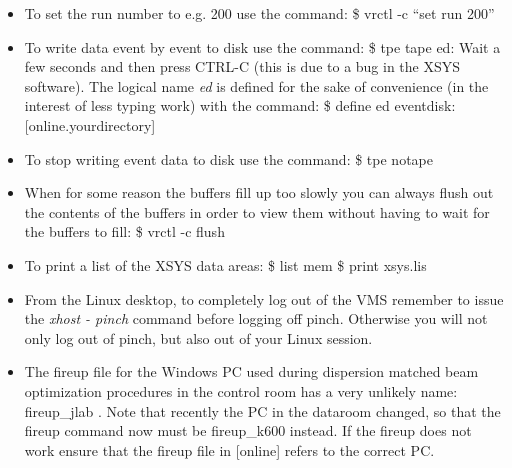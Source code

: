 \documentclass[11pt]{report}
\begin{document}
\begin{itemize}
\item To set the run number to e.g. 200 use the command: \newline \$ vrctl -c ``set run 200''
\item To write data event by event to disk use the command: \newline \$ tpe tape ed: \newline Wait a few seconds and then press CTRL-C (this is due to a bug in the XSYS software). The logical 
name {\it ed} is defined for the sake of convenience (in the interest of less typing work) with the command: \newline \$ define ed eventdisk:[online.yourdirectory]
\item To stop writing event data to disk use the command: \newline \$ tpe notape
\item When for some reason the buffers fill up too slowly you can always flush out the contents of the buffers in order to view them without having to wait for the buffers to fill: \newline \$ vrctl -c flush
\item To print a list of the XSYS data areas: \newline \$ list mem \newline \$ print xsys.lis
\item From the Linux desktop, to completely log out of the VMS remember to issue the {\it xhost - pinch} command before logging off pinch. Otherwise you will not only log out of pinch, but also out of your Linux session.
\item The fireup file for the Windows PC used during dispersion matched beam optimization procedures in the control room has a very unlikely name: fireup\_jlab
. Note that recently the PC in the dataroom changed, so that the fireup command now must be fireup\_k600 instead. If the fireup does not work ensure that the fireup file in [online] refers to the correct PC.
\end{itemize}


\end{document}
